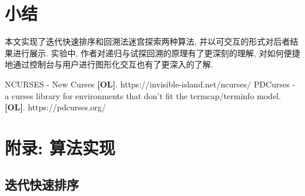 \documentclass[a4paper]{article}
\begin{document}
\section{小结}

本文实现了迭代快速排序和回溯法迷宫探索两种算法, 并以可交互的形式对后者结果进行展示.  实验中, 作者对递归与试探回溯的原理有了更深刻的理解, 对如何便捷地通过控制台与用户进行图形化交互也有了更深入的了解.

\begin{thebibliography}{}

 NCURSES - New Curses \textbf{[OL]}. https://invisible-island.net/ncurses/
 PDCurses - a curses library for environments that don't fit the termcap/terminfo model. \textbf{[OL]}. https://pdcurses.org/

\end{thebibliography}

\appendix

\section{附录: 算法实现}

\subsection{迭代快速排序}
\end{document}
